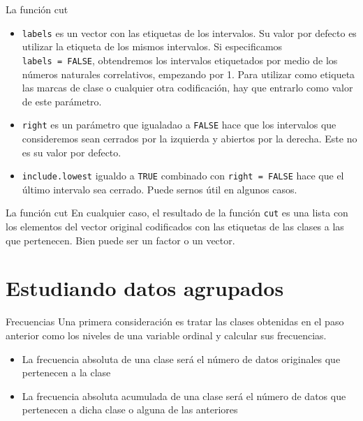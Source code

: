 \documentclass[
  ignorenonframetext,
]{beamer}
\providecommand{\tightlist}{%
  \setlength{\itemsep}{0pt}\setlength{\parskip}{0pt}}
\begin{document}
\begin{frame}[fragile]{La función cut}
\protect\hypertarget{la-funciuxf3n-cut-1}{}
\begin{itemize}
\tightlist
\item
  \texttt{labels} es un vector con las etiquetas de los intervalos. Su
  valor por defecto es utilizar la etiqueta de los mismos intervalos. Si
  especificamos \texttt{labels\ =\ FALSE}, obtendremos los intervalos
  etiquetados por medio de los números naturales correlativos, empezando
  por 1. Para utilizar como etiqueta las marcas de clase o cualquier
  otra codificación, hay que entrarlo como valor de este parámetro.
\item
  \texttt{right} es un parámetro que igualadao a \texttt{FALSE} hace que
  los intervalos que consideremos sean cerrados por la izquierda y
  abiertos por la derecha. Este no es su valor por defecto.
\item
  \texttt{include.lowest} igualdo a \texttt{TRUE} combinado con
  \texttt{right\ =\ FALSE} hace que el último intervalo sea cerrado.
  Puede sernos útil en algunos casos.
\end{itemize}
\end{frame}

\begin{frame}[fragile]{La función cut}
\protect\hypertarget{la-funciuxf3n-cut-2}{}
En cualquier caso, el resultado de la función \texttt{cut} es una lista
con los elementos del vector original codificados con las etiquetas de
las clases a las que pertenecen. Bien puede ser un factor o un vector.
\end{frame}

\hypertarget{estudiando-datos-agrupados}{%
\section{Estudiando datos agrupados}\label{estudiando-datos-agrupados}}

\begin{frame}{Frecuencias}
\protect\hypertarget{frecuencias}{}
Una primera consideración es tratar las clases obtenidas en el paso
anterior como los niveles de una variable ordinal y calcular sus
frecuencias.

\begin{itemize}
\tightlist
\item
  La frecuencia absoluta de una clase será el número de datos originales
  que pertenecen a la clase
\item
  La frecuencia absoluta acumulada de una clase será el número de datos
  que pertenecen a dicha clase o alguna de las anteriores
\end{itemize}
\end{frame}
\end{document}
